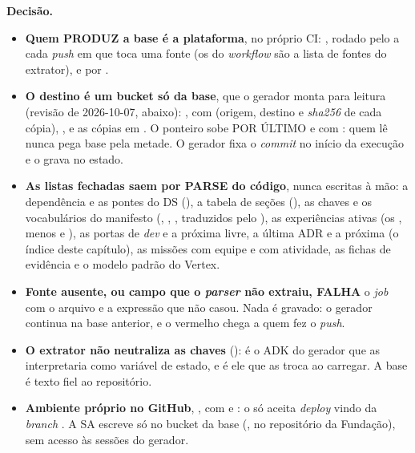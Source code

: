 \textbf{Decisão.}

\begin{itemize}
  \item \textbf{Quem PRODUZ a base é a plataforma}, no próprio CI:
    , rodado pelo
     a cada \emph{push} em
     que toca uma fonte (os  do \emph{workflow} são a
    lista de fontes do extrator), e por .
  \item \textbf{O destino é um bucket só da base}, que o gerador monta para
    leitura (revisão de 2026-10-07, abaixo):
    ,
    com  (origem, destino e \emph{sha256} de cada cópia),
    ,  e as cópias em
    . O ponteiro  sobe POR ÚLTIMO e com
    : quem lê nunca pega base pela metade. O
    gerador fixa o \emph{commit} no início da execução e o grava no estado.
  \item \textbf{As listas fechadas saem por PARSE do código}, nunca escritas à
    mão: a dependência e as pontes do DS (),
    a tabela de seções (), as chaves e
    os vocabulários do manifesto (, ,
    , traduzidos pelo ),
    as experiências ativas (os , menos  e
    ), as portas de \emph{dev} e a próxima livre, a última ADR e
    a próxima (o índice deste capítulo), as missões com equipe e com
    atividade, as fichas de evidência e o modelo padrão do Vertex.
  \item \textbf{Fonte ausente, ou campo que o \emph{parser} não extraiu, FALHA}
    o \emph{job} com o arquivo e a expressão que não casou. Nada é gravado: o
    gerador continua na base anterior, e o vermelho chega a quem fez o
    \emph{push}.
  \item \textbf{O extrator não neutraliza as chaves} (): é o
    ADK do gerador que as interpretaria como variável de estado, e é ele que
    as troca ao carregar. A base é texto fiel ao repositório.
  \item \textbf{Ambiente próprio no GitHub}, , com
     e : o  só aceita \emph{deploy}
    vindo da \emph{branch} . A SA escreve só no bucket da base
    (, no repositório da Fundação), sem acesso às
    sessões do gerador.
\end{itemize}

